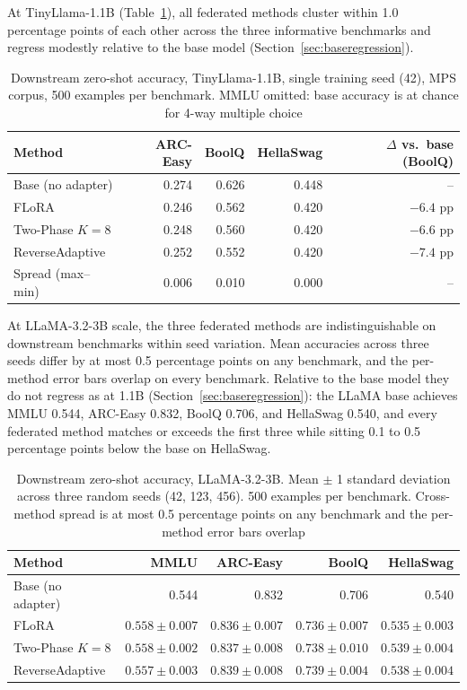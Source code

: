At TinyLlama-1.1B (Table~\ref{tab:downstream_tiny}), all federated methods cluster within 1.0 percentage points of each other across the three informative benchmarks and regress modestly relative to the base model (Section~\ref{sec:baseregression}).

\begin{table}[tbp]
\centering
\footnotesize
\setlength{\tabcolsep}{6pt}
\caption{Downstream zero-shot accuracy, TinyLlama-1.1B, single training seed (42), MPS corpus, 500 examples per benchmark. MMLU omitted: base accuracy is at chance for 4-way multiple choice}
\label{tab:downstream_tiny}
\begin{tabular}{@{}lrrrr@{}}
\toprule
Method & ARC-Easy & BoolQ & HellaSwag & $\Delta$ vs.\ base (BoolQ) \\
\midrule
Base (no adapter) & 0.274 & 0.626 & 0.448 & -- \\
FLoRA             & 0.246 & 0.562 & 0.420 & $-6.4$ pp \\
Two-Phase $K{=}8$ & 0.248 & 0.560 & 0.420 & $-6.6$ pp \\
ReverseAdaptive   & 0.252 & 0.552 & 0.420 & $-7.4$ pp \\
\midrule
Spread (max--min) & 0.006 & 0.010 & 0.000 & -- \\
\bottomrule
\end{tabular}
\end{table}

At LLaMA-3.2-3B scale, the three federated methods are indistinguishable on downstream benchmarks within seed variation. Mean accuracies across three seeds differ by at most 0.5 percentage points on any benchmark, and the per-method error bars overlap on every benchmark. Relative to the base model they do not regress as at 1.1B (Section~\ref{sec:baseregression}): the LLaMA base achieves MMLU 0.544, ARC-Easy 0.832, BoolQ 0.706, and HellaSwag 0.540, and every federated method matches or exceeds the first three while sitting 0.1 to 0.5 percentage points below the base on HellaSwag.

\begin{table}[bp]
\centering
\footnotesize
\setlength{\tabcolsep}{6pt}
\caption{Downstream zero-shot accuracy, LLaMA-3.2-3B. Mean $\pm$ 1 standard deviation across three random seeds (42, 123, 456). 500 examples per benchmark. Cross-method spread is at most 0.5 percentage points on any benchmark and the per-method error bars overlap}
\label{tab:downstream_llama}
\begin{tabular}{@{}lrrrr@{}}
\toprule
Method & MMLU & ARC-Easy & BoolQ & HellaSwag \\
\midrule
Base (no adapter) & 0.544 & 0.832 & 0.706 & 0.540 \\
FLoRA             & $0.558 \pm 0.007$ & $0.836 \pm 0.007$ & $0.736 \pm 0.007$ & $0.535 \pm 0.003$ \\
Two-Phase $K{=}8$ & $0.558 \pm 0.002$ & $0.837 \pm 0.008$ & $0.738 \pm 0.010$ & $0.539 \pm 0.004$ \\
ReverseAdaptive   & $0.557 \pm 0.003$ & $0.839 \pm 0.008$ & $0.739 \pm 0.004$ & $0.538 \pm 0.004$ \\
\bottomrule
\end{tabular}
\end{table}

